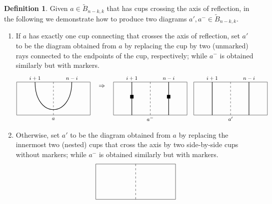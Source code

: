 \documentclass[11pt,reqno]{amsart}
\numberwithin{equation}{section}
\theoremstyle{definition}
\newtheorem{definition}[theorem]{Definition}
\newcommand{\tB}{\widetilde{B}}
\begin{document}
\begin{definition}
\alg\label{alg:fold}
Given $a\in \tB_{n-k,k}$ that has cups crossing the axis of reflection, in the following we demonstrate how to produce two diagrams $a', a^-  \in \tB_{n-k,k}$. 
\begin{enumerate}
\item If $a$ has exactly one cup connecting that crosses the axis of reflection, set $a'$ to be the diagram obtained from $a$ by replacing the cup by two (unmarked) rays connected to the endpoints of the cup, respectively; while $a^-$ is obtained similarly but with markers.
\[
\begin{tikzpicture}[baseline={(0,-.3)}]
\draw (-.5,0) -- (3.5,0) -- (3.5,-1.8) -- (-.5,-1.8) -- cycle;
\draw[dashed] (1.5,0)--(1.5,-1.8);
\begin{footnotesize}
\node at (0.5,.2) {$i+1$};
\node at (2.5,.2) {$n-i$};
\node at (1.5, -2) {$a$};
\end{footnotesize}
\draw[thick] (0.5,0) .. controls +(0,-2) and +(0,-2) .. +(2,0);
\end{tikzpicture}
\quad
\Rightarrow
\quad
\begin{tikzpicture}[baseline={(0,-.3)}]
\draw (-.5,0) -- (3.5,0) -- (3.5,-1.8) -- (-.5,-1.8) -- cycle;
\draw[dashed] (1.5,0)--(1.5,-1.8);
\begin{footnotesize}
\node at (0.5,.2) {$i+1$};
\node at (2.5,.2) {$n-i$};
\node at (.5, -0.8) {$\blacksquare$};
\node at (2.5, -0.8) {$\blacksquare$};
\node at (1.5, -2) {$a^-$};
\end{footnotesize}
\draw[thick] (0.5,0) -- (0.5, -1.8);
\draw[thick] (2.5,0) -- (2.5, -1.8);
\end{tikzpicture}
\quad
\begin{tikzpicture}[baseline={(0,-.3)}]
\draw (-.5,0) -- (3.5,0) -- (3.5,-1.8) -- (-.5,-1.8) -- cycle;
\draw[dashed] (1.5,0)--(1.5,-1.8);
\begin{footnotesize}
\node at (0.5,.2) {$i+1$};
\node at (2.5,.2) {$n-i$};
\node at (1.5, -2) {$a'$};
\end{footnotesize}
\draw[thick] (0.5,0) -- (0.5, -1.8);
\draw[thick] (2.5,0) -- (2.5, -1.8);
\end{tikzpicture}
\]
\item Otherwise, set $a'$ to be the diagram obtained from $a$ by replacing the innermost two (nested) cups that cross the axis by two side-by-side cups without markers; while $a^-$ is obtained similarly but with markers. 
\[
\begin{tikzpicture}[baseline={(0,-.3)}]
\draw (-.5,0) -- (3.5,0) -- (3.5,-1.8) -- (-.5,-1.8) -- cycle;
\draw[dashed] (1.5,0)--(1.5,-1.8);

\end{tikzpicture}\]
\end{enumerate}
\end{definition}
\end{document}
